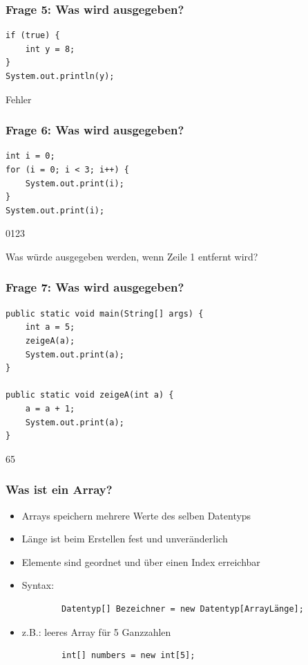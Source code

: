 \documentclass{../../presentation}
\begin{document}
\begin{frame}[fragile]
	\frametitle{Frage 5: Was wird ausgegeben?}
	\begin{verbatim}
if (true) {
    int y = 8;
}
System.out.println(y);

  \end{verbatim}
	\begin{ausgabe}
		Fehler
	\end{ausgabe}
\end{frame}

\begin{frame}[fragile]
	\frametitle{Frage 6: Was wird ausgegeben?}
	\begin{verbatim}
int i = 0;
for (i = 0; i < 3; i++) {
    System.out.print(i);
}
System.out.print(i);
  \end{verbatim}
	\begin{ausgabe}
		0123
	\end{ausgabe}
	Was würde ausgegeben werden, wenn Zeile 1 entfernt wird?
\end{frame}

\begin{frame}[fragile]
	\frametitle{Frage 7: Was wird ausgegeben?}
	\begin{verbatim}
public static void main(String[] args) {
    int a = 5;
    zeigeA(a);
    System.out.print(a);
}

public static void zeigeA(int a) {
    a = a + 1;
    System.out.print(a);
}
  \end{verbatim}
	\begin{ausgabe}
		65
	\end{ausgabe}
\end{frame}

\begin{frame}[fragile]
	\frametitle{Was ist ein Array?}
	\begin{itemize}
		\item\pause Arrays speichern mehrere Werte des selben Datentyps
		\item\pause Länge ist beim Erstellen fest und unveränderlich
		\item\pause Elemente sind geordnet und über einen Index erreichbar
		\item\pause Syntax:
		      \begin{verbatim}
        Datentyp[] Bezeichner = new Datentyp[ArrayLänge];
    \end{verbatim}
		\item\pause z.B.: leeres Array für 5 Ganzzahlen
		      \begin{verbatim}
		int[] numbers = new int[5];
	\end{verbatim}
	\end{itemize}
\end{frame}
\end{document}
